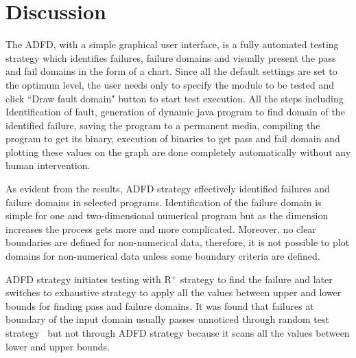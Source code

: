 



\section{Discussion} \label{sec:discussion4}

The ADFD, with a simple graphical user interface, is a fully automated testing strategy which identifies failures, failure domains and visually present the pass and fail domains in the form of a chart. Since all the default settings are set to the optimum level, the user needs only to specify the module to be tested and click ``Draw fault domain" button to start test execution. All the steps including Identification of fault, generation of dynamic java program to find domain of the identified failure, saving the program to a permanent media, compiling the program to get its binary, execution of binaries to get pass and fail domain and plotting these values on the graph are done completely automatically without any human intervention.

As evident from the results, ADFD strategy effectively identified failures and failure domains in selected programs. Identification of the failure domain is simple for one and two-dimensional numerical program but as the dimension increases the process gets more and more complicated. Moreover, no clear boundaries are defined for non-numerical data, therefore, it is not possible to plot domains for non-numerical data unless some boundary criteria are defined.

ADFD strategy initiates testing with R$^+$ strategy to find the failure and later switches to exhaustive strategy to apply all the values between upper and lower bounds for finding pass and failure domains. It was found that failures at boundary of the input domain usually passes unnoticed through random test strategy~\cite{reid1997empirical} but not through ADFD strategy because it scans all the values between lower and upper bounds.



